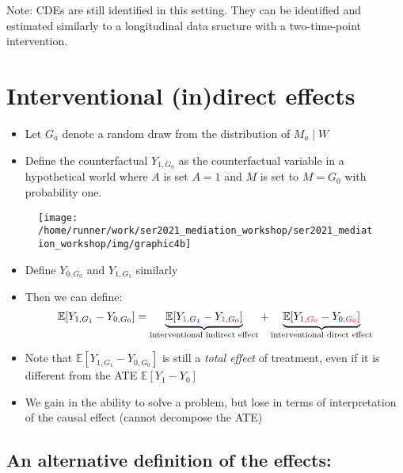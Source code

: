 \documentclass[
  12pt,
]{book}
\providecommand{\tightlist}{%
  \setlength{\itemsep}{0pt}\setlength{\parskip}{0pt}}
\theoremstyle{definition}
\theoremstyle{definition}
\theoremstyle{definition}
\newcommand{\E}{\mathbb{E}}
\newcommand{\1}{\mathbbm{1}}
\begin{document}
Note: CDEs are still identified in this setting. They can be identified and
estimated similarly to a longitudinal data sructure with a two-time-point
intervention.

\hypertarget{interventional-indirect-effects}{%
\section{Interventional (in)direct effects}\label{interventional-indirect-effects}}

\begin{itemize}
\tightlist
\item
  Let \(G_a\) denote a random draw from the distribution of \(M_a \mid W\)
\item
  Define the counterfactual \(Y_{1,G_0}\) as the counterfactual
  variable in a hypothetical world where \(A\) is set \(A=1\) and \(M\) is
  set to \(M=G_0\) with probability one.
\end{itemize}

\begin{figure}

{\centering \texttt{[image: /home/runner/work/ser2021\_mediation\_workshop/ser2021\_mediation\_workshop/img/graphic4b]} 

}

\end{figure}

\begin{itemize}
\tightlist
\item
  Define \(Y_{0,G_0}\) and \(Y_{1,G_1}\) similarly
\item
  Then we can define:
  \begin{equation*}
  \E[Y_{1,G_1} - Y_{0,G_0}] = \underbrace{\E[Y_{\color{red}{1},\color{blue}{G_1}} -
    Y_{\color{red}{1},\color{blue}{G_0}}]}_{\text{interventional indirect effect}} +
    \underbrace{\E[Y_{\color{blue}{1},\color{red}{G_0}} -
    Y_{\color{blue}{0},\color{red}{G_0}}]}_{\text{interventional direct effect}}
  \end{equation*}
\item
  Note that \(\E[Y_{1,G_1} - Y_{0,G_0}]\) is still a \emph{total effect} of treatment,
  even if it is different from the ATE \(\E[Y_{1} - Y_{0}]\)
\item
  We gain in the ability to solve a problem, but lose in terms of interpretation
  of the causal effect (cannot decompose the ATE)
\end{itemize}

\hypertarget{an-alternative-definition-of-the-effects}{%
\subsection{An alternative definition of the effects:}\label{an-alternative-definition-of-the-effects}}
\end{document}
